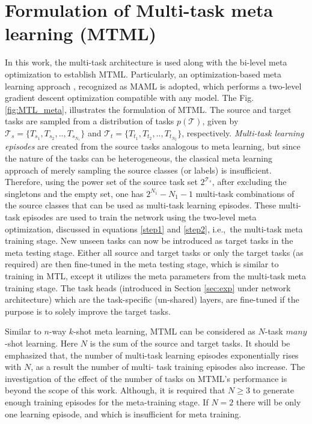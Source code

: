 \documentclass[conference]{IEEEtran}
\newcommand*{\ie}		{i.e.,\ }
\begin{document}
\section{Formulation of Multi-task meta learning (\ac{MTML})}
In this work, the multi-task architecture is used along with the bi-level meta optimization to establish \ac{MTML}. 
Particularly, an optimization-based meta learning approach \cite{huisman2021survey}, recognized as \ac{MAML} \cite{pmlr-v70-finn17a} is adopted, which performs a two-level gradient descent optimization compatible with any model. 
The Fig. \ref{fig:MTL_meta}, illustrates the formulation of \ac{MTML}. 
The source and target tasks are sampled from a distribution of tasks $p(\mathcal{T})$, given by $\mathcal{T}_s = \{T_{s_1},T_{s_2},..,T_{s_{N_1}}\}$ and $\mathcal{T}_t = \{T_{t_1},T_{t_2},..,T_{t_{N_2}}\}$, respectively. 
\textit{Multi-task learning episodes} are created from the source tasks analogous to meta learning, but since the nature of the tasks can be heterogeneous, the classical meta learning approach of merely sampling the source classes (or labels) is insufficient. 
Therefore, using the power set of the source task set $2^{{\mathcal T}_s}$, after excluding the singletons and the empty set, one has $2^{N_1} - N_1 - 1$ multi-task combinations of the source classes that can be used as multi-task learning episodes.
These multi-task episodes are used to train the network using the two-level meta optimization, discussed in equations \eqref{step1} and \eqref{step2}, \ie the multi-task meta training stage.
New unseen tasks can now be introduced as target tasks in the meta testing stage.
Either all source and target tasks or only the target tasks (as required) are then fine-tuned in the meta testing stage, which is similar to training in \ac{MTL}, except it utilizes the meta parameters from the  multi-task meta training stage.
The task heads (introduced in Section \ref{sec:exp} under network architecture) which are the task-specific (un-shared) layers, are fine-tuned if the purpose is to solely improve the target tasks.

Similar to $n$-way $k$-shot meta learning, \ac{MTML} can be considered as $N$-task $many$-shot learning. 
Here $N$ is the sum of the source and target tasks.
It should be emphasized that, the number of multi-task learning episodes exponentially rises with $N$, as a result the number of multi- task training episodes also increase.
The investigation of the effect of the number of tasks on MTML's performance is beyond the scope of this work.
Although, it is required that $N \ge 3$ to generate enough training episodes for the meta-training stage.
If $N = 2$ there will be only one learning episode, and which is insufficient for meta training.
\end{document}
